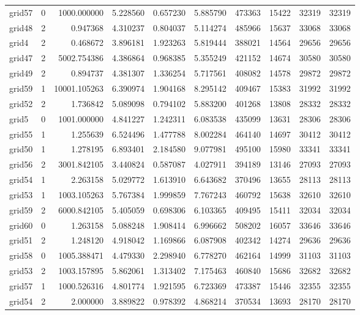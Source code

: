 \begin{longtable}{|l|r|r|r|r|r|r|r|r|r|}
grid57 & 0 & 1000.000000 & 5.228560 & 0.657230 & 5.885790 & 473363 & 15422 & 32319 & 32319 \\
grid48 & 2 & 0.947368 & 4.310237 & 0.804037 & 5.114274 & 485966 & 15637 & 33068 & 33068 \\
grid4 & 2 & 0.468672 & 3.896181 & 1.923263 & 5.819444 & 388021 & 14564 & 29656 & 29656 \\
grid47 & 2 & 5002.754386 & 4.386864 & 0.968385 & 5.355249 & 421152 & 14674 & 30580 & 30580 \\
grid49 & 2 & 0.894737 & 4.381307 & 1.336254 & 5.717561 & 408082 & 14578 & 29872 & 29872 \\
grid59 & 1 & 10001.105263 & 6.390974 & 1.904168 & 8.295142 & 409467 & 15383 & 31992 & 31992 \\
grid52 & 2 & 1.736842 & 5.089098 & 0.794102 & 5.883200 & 401268 & 13808 & 28332 & 28332 \\
grid5 & 0 & 1001.000000 & 4.841227 & 1.242311 & 6.083538 & 435099 & 13631 & 28306 & 28306 \\
grid55 & 1 & 1.255639 & 6.524496 & 1.477788 & 8.002284 & 464140 & 14697 & 30412 & 30412 \\
grid50 & 1 & 1.278195 & 6.893401 & 2.184580 & 9.077981 & 495100 & 15980 & 33341 & 33341 \\
grid56 & 2 & 3001.842105 & 3.440824 & 0.587087 & 4.027911 & 394189 & 13146 & 27093 & 27093 \\
grid54 & 1 & 2.263158 & 5.029772 & 1.613910 & 6.643682 & 370496 & 13655 & 28113 & 28113 \\
grid53 & 1 & 1003.105263 & 5.767384 & 1.999859 & 7.767243 & 460792 & 15638 & 32610 & 32610 \\
grid59 & 2 & 6000.842105 & 5.405059 & 0.698306 & 6.103365 & 409495 & 15411 & 32034 & 32034 \\
grid60 & 0 & 1.263158 & 5.088248 & 1.908414 & 6.996662 & 508202 & 16057 & 33646 & 33646 \\
grid51 & 2 & 1.248120 & 4.918042 & 1.169866 & 6.087908 & 402342 & 14274 & 29636 & 29636 \\
grid58 & 0 & 1005.388471 & 4.479330 & 2.298940 & 6.778270 & 462164 & 14999 & 31103 & 31103 \\
grid53 & 2 & 1003.157895 & 5.862061 & 1.313402 & 7.175463 & 460840 & 15686 & 32682 & 32682 \\
grid57 & 1 & 1000.526316 & 4.801774 & 1.921595 & 6.723369 & 473387 & 15446 & 32355 & 32355 \\
grid54 & 2 & 2.000000 & 3.889822 & 0.978392 & 4.868214 & 370534 & 13693 & 28170 & 28170 \\

\end{longtable}
